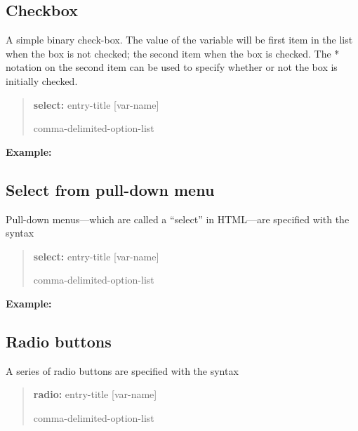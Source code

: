 \documentclass[letterpaper,10pt,english]{sphinxmanual}
\begin{document}
\subsection{Checkbox}
\label{forms:checkbox}
A simple binary check-box. The value of the variable will be first item
in the list when the box is not checked; the second item when the box is
checked. The * notation on the second item can be used to specify
whether or not the box is initially checked.
\begin{quote}

\begin{DUlineblock}{0em}
\item[] \textbf{select:} entry-title {[}var-name{]}
\item[] comma-delimited-option-list
\end{DUlineblock}
\end{quote}

\textbf{Example:}
\begin{quote}

\end{quote}


\subsection{Select from pull-down menu}
\label{forms:select-from-pull-down-menu}
Pull-down menus—which are called a “select” in HTML—are specified with
the syntax
\begin{quote}

\begin{DUlineblock}{0em}
\item[] \textbf{select:} entry-title {[}var-name{]}
\item[] comma-delimited-option-list
\end{DUlineblock}
\end{quote}

\textbf{Example:}
\begin{quote}

\end{quote}


\subsection{Radio buttons}
\label{forms:radio-buttons}
A series of radio buttons are specified with the syntax
\begin{quote}

\begin{DUlineblock}{0em}
\item[] \textbf{radio:} entry-title {[}var-name{]}
\item[] comma-delimited-option-list
\end{DUlineblock}
\end{quote}
\end{document}
